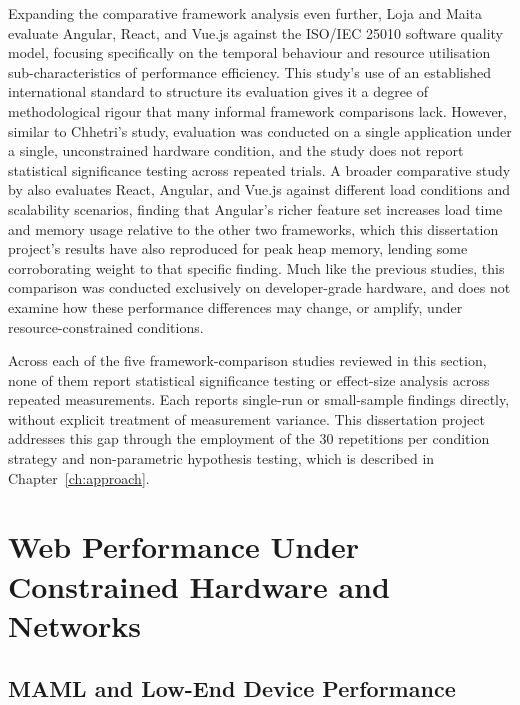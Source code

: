 \documentclass[11pt,a4paper]{report}
\begin{document}
Expanding the comparative framework analysis even further, Loja and Maita~\cite{loja-maita} evaluate Angular, React, and Vue.js against the ISO/IEC 25010 software quality model, focusing specifically on the temporal behaviour and resource utilisation sub-characteristics of performance efficiency. This study's use of an established international standard to structure its evaluation gives it a degree of methodological rigour that many informal framework comparisons lack. However, similar to Chhetri's study, evaluation was conducted on a single application under a single, unconstrained hardware condition, and the study does not report statistical significance testing across repeated trials. A broader comparative study by \cite{comparative-frameworks} also evaluates React, Angular, and Vue.js against different load conditions and scalability scenarios, finding that Angular's richer feature set increases load time and memory usage relative to the other two frameworks, which this dissertation project's results have also reproduced for peak heap memory, lending some corroborating weight to that specific finding. Much like the previous studies, this comparison was conducted exclusively on developer-grade hardware, and does not examine how these performance differences may change, or amplify, under resource-constrained conditions. 

\vspace{5mm}

Across each of the five framework-comparison studies reviewed in this section, none of them report statistical significance testing or effect-size analysis across repeated measurements. Each reports single-run or small-sample findings directly, without explicit treatment of measurement variance. This dissertation project addresses this gap through the employment of the 30 repetitions per condition strategy and non-parametric hypothesis testing, which is described in Chapter~\ref{ch:approach}. 

\section{Web Performance Under Constrained Hardware and Networks}
\subsection{MAML and Low-End Device Performance}
\end{document}
